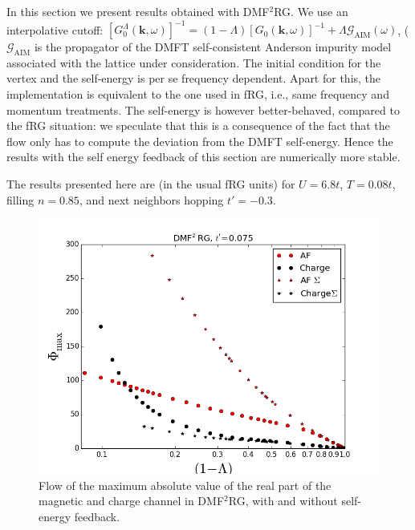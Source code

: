 In this section we present results obtained with DMF$^2$RG.  We use an interpolative cutoff: $[G_0^\Lambda(\mathbf{k},\omega)]^{-1} = (1-\Lambda)[G_0(\mathbf{k},\omega)]^{-1}+\Lambda \mathcal{G}_{\mathrm{AIM}}(\omega)$, ($\mathcal{G}_{\mathrm{AIM}}$ is the propagator of the DMFT self-consistent Anderson impurity model associated with the lattice under consideration. The initial condition for the vertex and the self-energy is per se frequency dependent. 
Apart for this, the implementation is equivalent to the one used in fRG, i.e., same frequency and momentum treatments. 
The self-energy is however better-behaved, compared to the fRG situation: we speculate that this is a consequence of the fact that the flow only has to compute the deviation from the DMFT self-energy. Hence the results with the self energy feedback of this section are numerically more stable.  

The results presented here are (in the usual fRG units) for $U=6.8t$, $T=0.08t$, filling $n=0.85$, and next neighbors hopping $t'=-0.3$.  
\begin{figure}
\includegraphics[scale=0.70]{images/dmf2rglam.png}
\caption{Flow of the maximum absolute value of the real part of the magnetic and charge channel in DMF$^2$RG, with and without self-energy feedback.} \label{dmf2rglam}
\end{figure}


